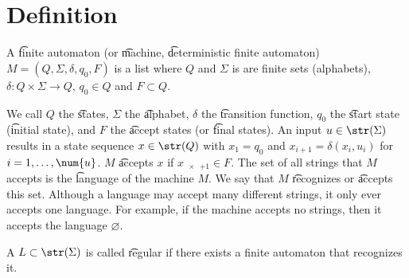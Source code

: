 

\section*{Definition}

A \t{finite automaton} (or \t{machine}, \t{deterministic finite automaton}) $M = (Q, \Sigma , \delta , q_0, F)$ is a list where $Q$ and $\Sigma $ is are finite sets (alphabets), $\delta : Q \times  \Sigma  \to Q$, $q_0 \in Q$ and $F \subset Q$.

We call $Q$ the \t{states}, $\Sigma $ the \t{alphabet}, $\delta $ the \t{transition function}, $q_0$ the \t{start state} (\t{initial state}), and $F$ the \t{accept states} (or \t{final states}).
An input $u \in \str(\Sigma )$ results in a state sequence $x \in \str(Q)$ with $x_1 = q_0$ and $x_{i+1} = \delta (x_i, u_i)$ for $i = 1, \dots , \num{u}$.
$M$ \t{accepts} $x$ if $x_{\num{x}+1} \in F$.
The set of all strings that $M$ accepts is the \t{language} of the machine $M$.
We say that $M$ \t{recognizes} or \t{accepts} this set.
Although a language may accept many different strings, it only ever accepts one language.
For example, if the machine accepts no strings, then it accepts the language $\varnothing$.

A $L \subset \str(\Sigma )$ is called \t{regular} if there exists a finite automaton that recognizes it.

\blankpage